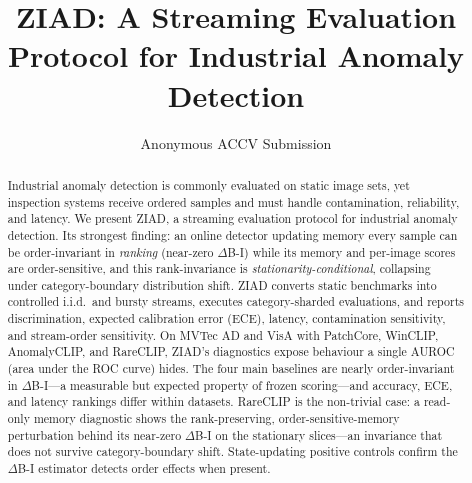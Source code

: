 \documentclass[runningheads]{llncs}
\title{ZIAD: A Streaming Evaluation Protocol for Industrial Anomaly Detection}
\author{Anonymous ACCV Submission}
\institute{Paper ID *****}
\begin{document}
\maketitle
\begin{abstract}
Industrial anomaly detection is commonly evaluated on static image sets, yet
inspection systems receive ordered samples and must handle contamination,
reliability, and latency. We present ZIAD, a streaming
evaluation protocol for industrial anomaly detection. Its strongest finding: an
online detector updating memory every sample can be order-invariant in
\emph{ranking} (near-zero $\Delta$B-I) while its memory and per-image scores are
order-sensitive, and this rank-invariance is \emph{stationarity-conditional},
collapsing under category-boundary distribution shift. ZIAD converts static
benchmarks into controlled i.i.d.\ and bursty streams, executes
category-sharded evaluations, and reports discrimination, expected calibration
error (ECE), latency, contamination sensitivity, and stream-order sensitivity.
On MVTec AD and VisA with PatchCore,
WinCLIP, AnomalyCLIP, and RareCLIP, ZIAD's diagnostics expose behaviour a single
AUROC (area under the ROC curve) hides. The four main baselines are nearly order-invariant in $\Delta$B-I---a
measurable but expected property of frozen scoring---and accuracy, ECE, and
latency rankings differ within datasets. RareCLIP is the non-trivial case: a
read-only memory diagnostic shows the rank-preserving, order-sensitive-memory
perturbation behind its near-zero $\Delta$B-I on the stationary slices---an
invariance that does not survive category-boundary shift.
State-updating positive controls confirm the $\Delta$B-I estimator detects order
effects when present.
\end{abstract}
\end{document}
